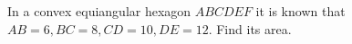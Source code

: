In a convex equiangular hexagon $ABCDEF$ it is known that $AB=6, BC=8, CD=10, DE=12$. Find its area.
